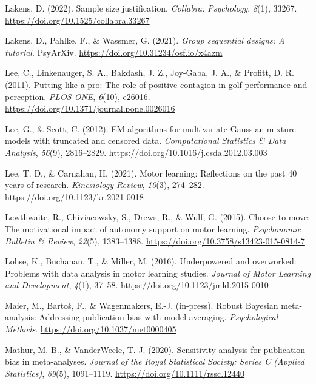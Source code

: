 \documentclass[
  doc, donotrepeattitle,floatsintext]{apa7}
\newlength{\cslhangindent}
\newlength{\cslentryspacingunit} %
\newenvironment{CSLReferences}[2] %
 {%
  \setlength{\parindent}{0pt}
  \ifodd #1
  \let\oldpar\par
  \def\par{\hangindent=\cslhangindent\oldpar}
  \fi
  \setlength{\parskip}{#2\cslentryspacingunit}
 }%
 {}
\begin{document}
\begin{CSLReferences}{1}{0}
\leavevmode{}%
Lakens, D. (2022). Sample size justification. \emph{Collabra: Psychology}, \emph{8}(1), 33267. \url{https://doi.org/10.1525/collabra.33267}

\leavevmode{}%
Lakens, D., Pahlke, F., \& Wassmer, G. (2021). \emph{Group sequential designs: A tutorial}. {PsyArXiv}. \url{https://doi.org/10.31234/osf.io/x4azm}

\leavevmode{}%
Lee, C., Linkenauger, S. A., Bakdash, J. Z., Joy-Gaba, J. A., \& Profitt, D. R. (2011). Putting like a pro: The role of positive contagion in golf performance and perception. \emph{PLOS ONE}, \emph{6}(10), e26016. \url{https://doi.org/10.1371/journal.pone.0026016}

\leavevmode{}%
Lee, G., \& Scott, C. (2012). {EM} algorithms for multivariate {Gaussian} mixture models with truncated and censored data. \emph{Computational Statistics \& Data Analysis}, \emph{56}(9), 2816--2829. \url{https://doi.org/10.1016/j.csda.2012.03.003}

\leavevmode{}%
Lee, T. D., \& Carnahan, H. (2021). Motor learning: Reflections on the past 40 years of research. \emph{Kinesiology Review}, \emph{10}(3), 274--282. \url{https://doi.org/10.1123/kr.2021-0018}

\leavevmode{}%
Lewthwaite, R., Chiviacowsky, S., Drews, R., \& Wulf, G. (2015). Choose to move: The motivational impact of autonomy support on motor learning. \emph{Psychonomic Bulletin \& Review}, \emph{22}(5), 1383--1388. \url{https://doi.org/10.3758/s13423-015-0814-7}

\leavevmode{}%
Lohse, K., Buchanan, T., \& Miller, M. (2016). Underpowered and overworked: Problems with data analysis in motor learning studies. \emph{Journal of Motor Learning and Development}, \emph{4}(1), 37--58. \url{https://doi.org/10.1123/jmld.2015-0010}

\leavevmode{}%
Maier, M., Bartoš, F., \& Wagenmakers, E.-J. (in-press). Robust {Bayesian} meta-analysis: Addressing publication bias with model-averaging. \emph{Psychological Methods}. \url{https://doi.org/10.1037/met0000405}

\leavevmode{}%
Mathur, M. B., \& VanderWeele, T. J. (2020). Sensitivity analysis for publication bias in meta-analyses. \emph{Journal of the Royal Statistical Society: Series C (Applied Statistics)}, \emph{69}(5), 1091--1119. \url{https://doi.org/10.1111/rssc.12440}


\end{CSLReferences}
\end{document}
